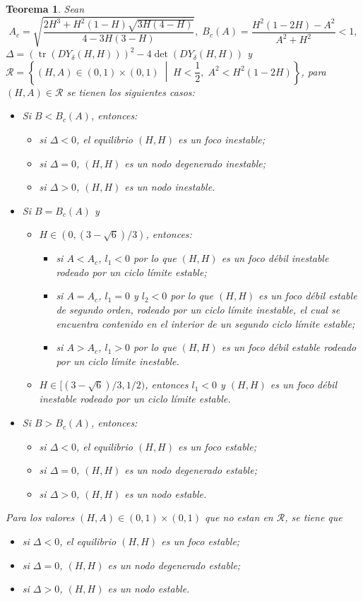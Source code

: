 \documentclass[]{article}
\newtheorem{theorem}{Teorema}[section]
\theoremstyle{remark}
\begin{document}
	\begin{theorem}
		Sean $$A_c = \sqrt{\dfrac{2H^3 + H^2(1 - H)\sqrt{3H(4 - H)}}{4-3H(3-H)}}, \; B_c(A) = \dfrac{H^2(1-2H) - A^2}{A^2 + H^2}<1,$$ $\Delta = (\operatorname{tr}(DY_\delta(H,H)))^2 - 4\det(DY_\delta(H,H))$ y $\mathcal{R} = \left\{ (H, A) \in (0, 1) \times (0, 1) \;\middle|\; H < \dfrac{1}{2}, \; A^2 < H^2(1 - 2H) \right\}$, para $(H, A) \in \mathcal{R}$ se tienen los siguientes casos:
		\begin{itemize}
			\item Si $B<B_c(A)$, entonces:
			\begin{itemize}
				\item si $\Delta<0$, el equilibrio $(H,H)$ es un foco inestable;
				\item si $\Delta=0$, $(H,H)$ es un nodo degenerado inestable;
				\item si $\Delta>0$, $(H,H)$ es un nodo inestable.
			\end{itemize}
			\item Si $B=B_c(A)$ y
			\begin{itemize}
				\item $H \in \left(0,(3 - \sqrt{6})/3 \right)$, entonces:
				\begin{itemize}
					\item si $A<A_c$, $l_1<0$ por lo que $(H,H)$ es un foco débil inestable rodeado por un ciclo límite estable;
					\item si $A=A_c$, $l_1=0$ y $l_2<0$ por lo que $(H,H)$ es un foco débil estable de segundo orden, rodeado por un ciclo límite inestable, el cual se encuentra contenido en el interior de un segundo ciclo límite estable;
					\item si $A>A_c$, $l_1>0$ por lo que $(H,H)$ es un foco débil estable rodeado por un ciclo límite inestable.
				\end{itemize}
				\item $H \in [(3 - \sqrt{6})/3, 1/2)$, entonces $l_1<0$ y $(H,H)$ es un foco débil inestable rodeado por un ciclo límite estable.
			\end{itemize}
			\item Si $B>B_c(A)$, entonces:
			\begin{itemize}
				\item si $\Delta<0$, el equilibrio $(H,H)$ es un foco estable;
				\item si $\Delta=0$, $(H,H)$ es un nodo degenerado estable;
				\item si $\Delta>0$, $(H,H)$ es un nodo estable.
			\end{itemize}
		\end{itemize}
		Para los valores $(H, A) \in (0, 1) \times (0, 1)$ que no estan en $\mathcal{R}$, se tiene que
		\begin{itemize}
			\item si $\Delta<0$, el equilibrio $(H,H)$ es un foco estable;
			\item si $\Delta=0$, $(H,H)$ es un nodo degenerado estable;
			\item si $\Delta>0$, $(H,H)$ es un nodo estable.
		\end{itemize}
		\label{teo: equilibrioH}
	\end{theorem}
\end{document}
